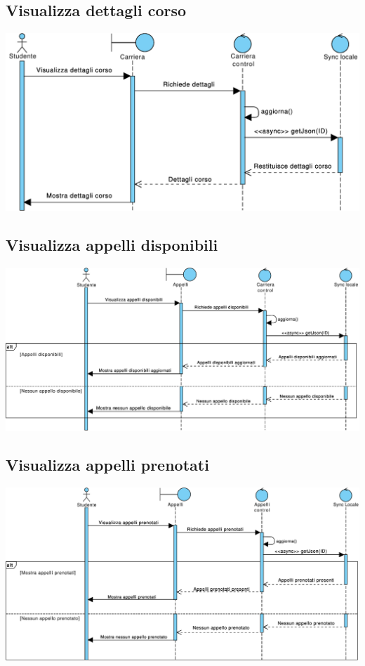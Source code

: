 \subsection{Visualizza dettagli corso}
\begin{center}
	\includegraphics[width=6.5in]{imgs/gruppo1/sequence_diagrams/SD5_visualizza_dettagli_corso.pdf}
\end{center}
\subsection{Visualizza appelli disponibili}
\begin{center}
	\includegraphics[width=6.5in]{imgs/gruppo1/sequence_diagrams/SD6_visualizza_appelli_disponibili.pdf}
\end{center}
\newpage


\subsection{Visualizza appelli prenotati}
\begin{center}
	\includegraphics[width=6.5in]{imgs/gruppo1/sequence_diagrams/SD7_visualizza_appelli_prenotati.pdf}
\end{center}
